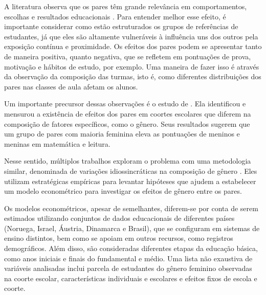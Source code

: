 A literatura observa que os pares têm grande relevância em comportamentos, escolhas e resultados educacionais \autocite{Sacerdote2014, Zimmerman2003}. Para entender melhor esse efeito, é importante considerar como estão estruturados os grupos de referências de estudantes, já que eles são altamente vulneráveis à influência uns dos outros pela exposição contínua e proximidade. Os efeitos dos pares podem se apresentar tanto de maneira positiva, quanto negativa, que se refletem em pontuações de prova, motivação e hábitos de estudo, por exemplo. Uma maneira de fazer isso é através da observação da composição das turmas, isto é, como diferentes distribuições dos pares nas classes de aula afetam os alunos.

Um importante precursor dessas observações é o estudo de \citet{Hoxby-2000}. Ela identificou e mensurou a existência de efeitos dos pares em coortes escolares que diferem na composição de fatores específicos, como o gênero. Seus resultados sugerem que um grupo de pares com maioria feminina eleva as pontuações de meninos e meninas em matemática e leitura.

Nesse sentido, múltiplos trabalhos exploram o problema com uma metodologia similar, denominada de variações idiossincráticas na composição de gênero \autocite{Schne2019, Lavy2011, Schneeweis2012, Brene2020, Borges2021}. Eles utilizam estratégicas empíricas para levantar hipóteses que ajudem a estabelecer um modelo econométrico para investigar os efeitos de gênero entre os pares. 


Os modelos econométricos, apesar de semelhantes, diferem-se por conta de serem estimados utilizando conjuntos de dados educacionais de diferentes países (Noruega, Israel, Áustria, Dinamarca e Brasil), que se configuram em sistemas de ensino distintos, bem como se apoiam em outros recursos, como registros demográficos. Além disso, são consideradas diferentes etapas da educação básica, como anos iniciais e finais do fundamental e médio. Uma lista não exaustiva de variáveis analisadas inclui parcela de estudantes do gênero feminino observadas na coorte escolar, características individuais e escolares e efeitos fixos de escola e coorte. 

